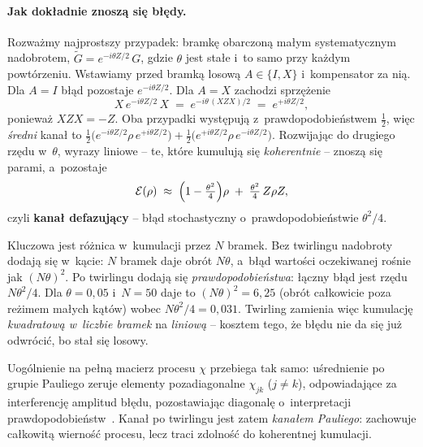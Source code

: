 \documentclass[11pt]{article}
\begin{document}
\paragraph{Jak dokładnie znoszą się błędy.} Rozważmy najprostszy przypadek: bramkę obarczoną małym
systematycznym nadobrotem, $\tilde{G} = e^{-i\theta Z/2}\,G$, gdzie $\theta$ jest stałe i~to samo
przy każdym powtórzeniu. Wstawiamy przed bramką losową $A \in \{I, X\}$ i~kompensator za nią. Dla
$A=I$ błąd pozostaje $e^{-i\theta Z/2}$. Dla $A=X$ zachodzi sprzężenie
\begin{equation}
  X\,e^{-i\theta Z/2}\,X \;=\; e^{-i\theta\,(XZX)/2} \;=\; e^{+i\theta Z/2},
  \label{eq:twirl-conj}
\end{equation}
ponieważ $XZX = -Z$. Oba przypadki występują z~prawdopodobieństwem $\tfrac12$, więc \emph{średni}
kanał to $\tfrac12\bigl(e^{-i\theta Z/2}\rho\,e^{+i\theta Z/2}\bigr) + \tfrac12\bigl(e^{+i\theta
Z/2}\rho\,e^{-i\theta Z/2}\bigr)$. Rozwijając do drugiego rzędu w~$\theta$, wyrazy liniowe -- te,
które kumulują się \emph{koherentnie} -- znoszą się parami, a~pozostaje
\begin{equation}
  \mathcal{E}(\rho) \;\approx\; \Bigl(1 - \tfrac{\theta^2}{4}\Bigr)\rho \;+\; \tfrac{\theta^2}{4}\,
  Z\rho Z ,
  \label{eq:twirl-dephasing}
\end{equation}
czyli \textbf{kanał defazujący} -- błąd stochastyczny o~prawdopodobieństwie $\theta^2/4$.

Kluczowa jest różnica w~kumulacji przez $N$ bramek. Bez twirlingu nadobroty dodają się w~kącie:
$N$ bramek daje obrót $N\theta$, a~błąd wartości oczekiwanej rośnie jak $(N\theta)^2$. Po twirlingu
dodają się \emph{prawdopodobieństwa}: łączny błąd jest rzędu $N\theta^2/4$. Dla $\theta = 0{,}05$
i~$N=50$ daje to $(N\theta)^2 = 6{,}25$ (obrót całkowicie poza reżimem małych kątów) wobec
$N\theta^2/4 = 0{,}031$. Twirling zamienia więc kumulację \emph{kwadratową w~liczbie bramek} na
\emph{liniową} -- kosztem tego, że błędu nie da się już odwrócić, bo stał się losowy.

Uogólnienie na pełną macierz procesu $\chi$ przebiega tak samo: uśrednienie po grupie Pauliego zeruje
elementy pozadiagonalne $\chi_{jk}$ ($j \neq k$), odpowiadające za interferencję amplitud błędu,
pozostawiając diagonalę o~interpretacji prawdopodobieństw~\cite{wallman2016,nielsen2010}. Kanał po
twirlingu jest zatem \emph{kanałem Pauliego}: zachowuje całkowitą wierność procesu, lecz traci
zdolność do koherentnej kumulacji.
\end{document}

